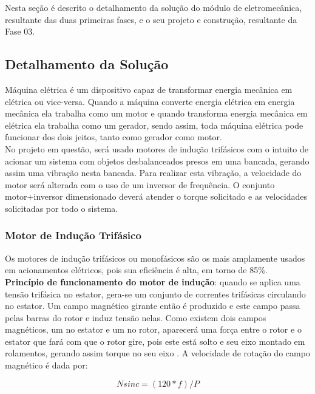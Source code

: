  \label{desenvolvimento_eletromecanica}
Nesta seção é descrito o detalhamento da solução do módulo de eletromecânica, resultante das duas primeiras fases, 
e o seu projeto e construção, resultante da Fase 03.

\subsection{Detalhamento da Solução}
Máquina elétrica é um dispositivo capaz de transformar energia mecânica em elétrica ou vice-versa. 
Quando a máquina converte energia elétrica em energia mecânica ela trabalha como um motor e quando transforma
energia mecânica em elétrica ela trabalha como um gerador, sendo assim, toda máquina elétrica pode funcionar dos dois jeitos, 
tanto como gerador como motor. \cite{chapman}  \\

No projeto em questão, será usado motores de indução trifásicos com o intuito de acionar um sistema com objetos 
desbalanceados presos em uma bancada, gerando assim uma vibração nesta bancada. Para realizar esta vibração, a velocidade 
do motor será alterada com o uso de um inversor de frequência. O conjunto motor+inversor dimensionado deverá atender o torque 
solicitado e as velocidades solicitadas por todo o sistema.\\


\subsubsection*{\textbf{Motor de Indução Trifásico}}

Os motores de indução trifásicos ou monofásicos são os mais amplamente usados em acionamentos elétricos, pois sua 
eficiência é alta, em torno de 85\%.\cite{WEG}
\\

\textbf{Princípio de funcionamento do motor de indução}: quando se aplica uma tensão trifásica no estator,
gera-se um conjunto de correntes trifásicas circulando no estator. Um campo magnético girante então é produzido e este 
campo passa pelas barras do rotor e induz tensão nelas. Como existem dois campos magnéticos, um no estator e um no rotor, 
aparecerá uma força entre o rotor e o estator que fará com que o rotor gire, pois este está solto e seu eixo montado em rolamentos, 
gerando assim torque no seu eixo \cite{chapman}. A velocidade de rotação do campo magnético é dada por:


    \begin{equation}\label{Rotação de Campo Mag.}
            Nsinc=(120*f)/P
    \end{equation}

